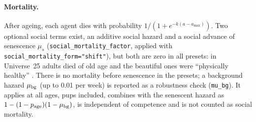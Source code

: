\documentclass[preprint,12pt,authoryear]{elsarticle}
\begin{document}
\paragraph{Mortality.}
After ageing, each agent dies with probability $1/(1+e^{-k(a-a_{\max})})$.
Two optional social terms exist, an additive social hazard and a social advance of senescence $\mu_s$ (\texttt{social\_mortality\_factor}, applied with \texttt{social\_mortality\_form="shift"}),
but both are zero in all presets: in Universe~25 adults died of old
age and the beautiful ones were ``physically healthy'' \citep{Calhoun1973}. There is no mortality before senescence in
the presets; a background hazard $\mu_{\rm bg}$ (up to 0.01 per week) is reported as a robustness check
(\texttt{mu\_bg}). It applies at all ages, pups included, combines with the senescent hazard as
$1-(1-p_{\rm age})(1-\mu_{\rm bg})$, is independent of competence and is not counted as social mortality.
\end{document}

